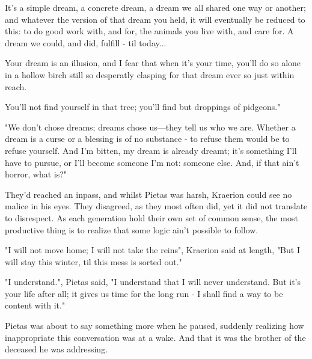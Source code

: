 It's a simple dream, a concrete dream, a dream we all shared one way or another; and whatever the version of that dream you held, it will eventually be reduced to this: to do good work with, and for, the animals you live with, and care for. A dream we could, and did, fulfill - til today...

Your dream is an illusion, and I fear that when it's your time, you'll do so alone in a hollow birch still so desperatly clasping for that dream ever so just within reach.

You'll not find yourself in that tree; you'll find but droppings of pidgeons."

"We don't chose dreams; dreams chose us—they tell us who we are. Whether a dream is a curse or a blessing is of no substance - to refuse them would be to refuse yourself. And I'm bitten, my dream is already dreamt; it's something I'll have to pursue, or I'll become someone I'm not: someone else. And, if that ain't horror, what is?"




They'd reached an inpass, and whilst Pietas was harsh, Kraerion could see no malice in his eyes. They disagreed, as they most often did, yet it did not translate to disrespect. As each generation %
hold their own set of common sense, the most productive thing is to realize that some logic ain't possible to follow.

"I will not move home; I will not take the reins", Kraerion said at length, "But I will stay this winter, til this mess is sorted out."

"I understand.", Pietas said, "I understand that I will never understand. But it's your life after all; it gives us time for the long run - I shall find a way to be content with it." 

Pietas was about to say something more when he paused, suddenly realizing how inappropriate this conversation was at a wake. And that it was the brother of the deceased he was addressing. 

